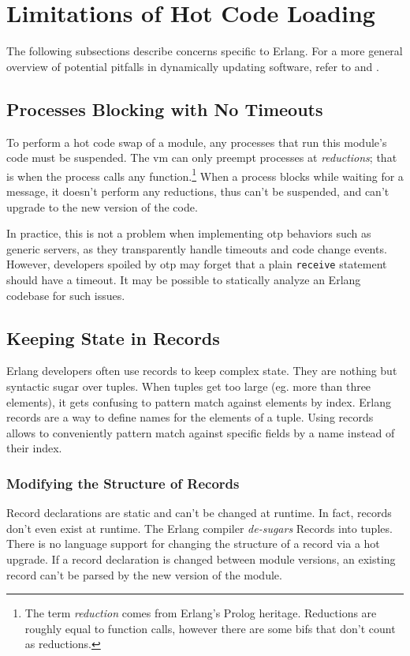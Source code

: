 \section{Limitations of Hot Code Loading}

The following subsections describe concerns specific to Erlang. For a more general overview of potential pitfalls in dynamically updating software, refer to \cite{gregersen:phenomena} and \cite{hicks}.

\subsection{Processes Blocking with No Timeouts}

To perform a hot code swap of a module, any processes that run this module's code must be suspended. The \acrshort{vm} can only preempt processes at \emph{reductions}; that is when the process calls any function.\footnote{The term \emph{reduction} comes from Erlang's Prolog heritage. Reductions are roughly equal to function calls, however there are some \acrshort{bif}s that don't count as reductions.} When a process blocks while waiting for a message, it doesn't perform any reductions, thus can't be suspended, and can't upgrade to the new version of the code.

In practice, this is not a problem when implementing \acrshort{otp} behaviors such as generic servers, as they transparently handle timeouts and code change events. However, developers spoiled by \acrshort{otp} may forget that a plain \lstinline|receive| statement should have a timeout. It may be possible to statically analyze an Erlang codebase for such issues.

\subsection{Keeping State in Records}

Erlang developers often use records to keep complex state. They are nothing but syntactic sugar over tuples. When tuples get too large (eg. more than three elements), it gets confusing to pattern match against elements by index. Erlang records are a way to define names for the elements of a tuple. Using records allows to conveniently pattern match against specific fields by a name instead of their index.


\subsubsection{Modifying the Structure of Records}
Record declarations are static and can't be changed at runtime. In fact, records don't even exist at runtime. The Erlang compiler \emph{de-sugars} Records into tuples. There is no language support for changing the structure of a record via a hot upgrade. If a record declaration is changed between module versions, an existing record can't be parsed by the new version of the module.

